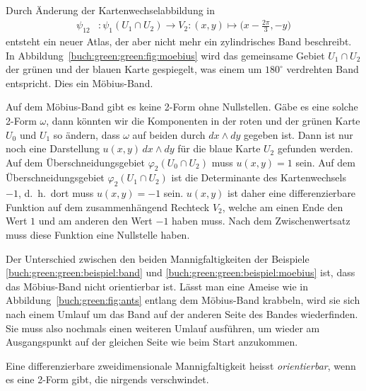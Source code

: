 \begin{beispiel}
\label{buch:green:green:beispiel:moebius}
%
Durch Änderung der Kartenwechselabbildung in
\begin{align*}
\psi_{12}&\colon
\psi_1(U_1\cap U_2)
\to
V_2
:(x,y) \mapsto \biggl(x-\frac{2\pi}3,-y\biggr)
\end{align*}
entsteht ein neuer Atlas, der aber nicht mehr ein zylindrisches Band
beschreibt.
In Abbildung~\ref{buch:green:green:fig:moebius} wird das gemeinsame
Gebiet $U_1\cap U_2$ der grünen und der blauen Karte gespiegelt,
was einem um $180^\circ$ verdrehten Band entspricht.
Dies ein Möbius-Band.

Auf dem Möbius-Band gibt es keine 2-Form ohne Nullstellen.
%
Gäbe es eine solche 2-Form $\omega$, dann könnten wir die Komponenten
in der roten und der grünen Karte $U_0$ und $U_1$ so ändern, dass
$\omega$ auf beiden durch $dx\wedge dy$ gegeben ist.
Dann ist nur noch eine Darstellung $u(x,y)\,dx\wedge dy$ für die 
blaue Karte $U_2$ gefunden werden.
Auf dem Überschneidungsgebiet $\varphi_2(U_0\cap U_2)$ muss $u(x,y)=1$
sein.
Auf dem Überschneidungsgebiet $\varphi_2(U_1\cap U_2)$ ist die 
Determinante des Kartenwechsels $-1$, d.~h.~dort muss $u(x,y)=-1$
sein.
$u(x,y)$ ist daher eine differenzierbare Funktion auf dem zusammenhängend
Rechteck $V_2$, welche am einen Ende den Wert $1$ und am anderen den 
Wert $-1$ haben muss.
Nach dem Zwischenwertsatz muss diese Funktion eine Nullstelle haben.
\end{beispiel}

%
Der Unterschied zwischen den beiden Mannigfaltigkeiten der Beispiele
\ref{buch:green:green:beispiel:band}
und
\ref{buch:green:green:beispiel:moebius}
ist, dass das Möbius-Band nicht orientierbar ist.
Lässt man eine Ameise wie in Abbildung~\ref{buch:green:fig:ants}
entlang dem Möbius-Band krabbeln, wird sie
sich nach einem Umlauf um das Band auf der anderen Seite des Bandes
wiederfinden.
Sie muss also nochmals einen weiteren Umlauf ausführen, um wieder
am Ausgangspunkt auf der gleichen Seite wie beim Start anzukommen.

\begin{definition}
\label{buch:green:def:orientierung}
Eine differenzierbare zweidimensionale Mannigfaltigkeit heisst 
\emph{orientierbar}, wenn es eine 2-Form gibt, die nirgends
%
verschwindet.
\end{definition}

